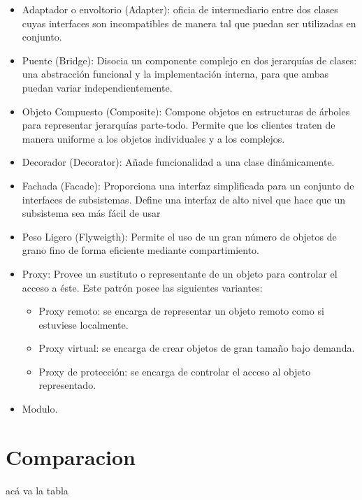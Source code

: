 \documentclass[10pt]{article}
\begin{document}
{{\begin{itemize}
\item Adaptador o envoltorio (Adapter): oficia de intermediario entre dos clases cuyas interfaces 
son incompatibles de manera tal que puedan ser utilizadas en 
conjunto. 
\item Puente (Bridge): Disocia un componente complejo en dos jerarquías de 
clases: una abstracción funcional y la implementación interna, para 
que ambas puedan variar independientemente.
\item Objeto Compuesto (Composite): Compone objetos en estructuras de árboles para 
representar jerarquías parte-todo. Permite que los clientes traten de 
manera uniforme a los objetos individuales y a los complejos. 
\item Decorador (Decorator): Añade funcionalidad a una clase dinámicamente.
\item Fachada (Facade): Proporciona una interfaz simplificada para un conjunto de 
interfaces de subsistemas. Define una interfaz de alto nivel que 
hace que un subsistema sea más fácil de usar
\item Peso Ligero (Flyweigth): Permite el uso de un gran número de objetos de grano 
fino de forma eficiente mediante compartimiento.
\item Proxy: Provee un sustituto o representante de un objeto para 
controlar el acceso a éste. Este patrón posee las siguientes variantes:
\begin{itemize} 
\item Proxy remoto: se encarga de representar un objeto remoto 
como si estuviese localmente. 
\item Proxy virtual: se encarga de crear objetos de gran tamaño bajo 
demanda. 
\item Proxy de protección: se encarga de controlar el acceso al objeto 
representado.
\end{itemize}

\item Modulo.

\end{itemize}






\newpage
\section{Comparacion}
acá va la tabla

}}
\end{document}
